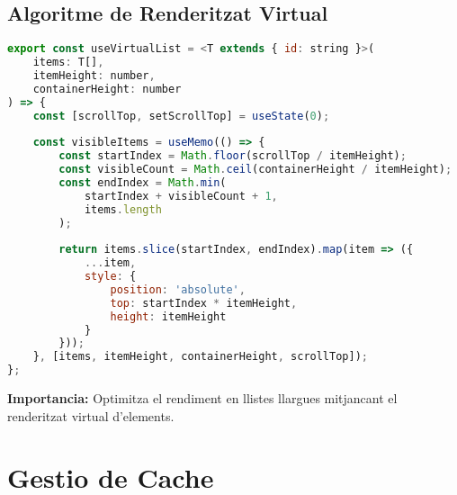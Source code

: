 \subsection{Algoritme de Renderitzat Virtual}
\begin{lstlisting}[language=JavaScript]
export const useVirtualList = <T extends { id: string }>(
    items: T[],
    itemHeight: number,
    containerHeight: number
) => {
    const [scrollTop, setScrollTop] = useState(0);
    
    const visibleItems = useMemo(() => {
        const startIndex = Math.floor(scrollTop / itemHeight);
        const visibleCount = Math.ceil(containerHeight / itemHeight);
        const endIndex = Math.min(
            startIndex + visibleCount + 1,
            items.length
        );
        
        return items.slice(startIndex, endIndex).map(item => ({
            ...item,
            style: {
                position: 'absolute',
                top: startIndex * itemHeight,
                height: itemHeight
            }
        }));
    }, [items, itemHeight, containerHeight, scrollTop]);
};
\end{lstlisting}
\textbf{Importancia:} Optimitza el rendiment en llistes llargues mitjancant el renderitzat virtual d'elements.

\section{Gestio de Cache}

